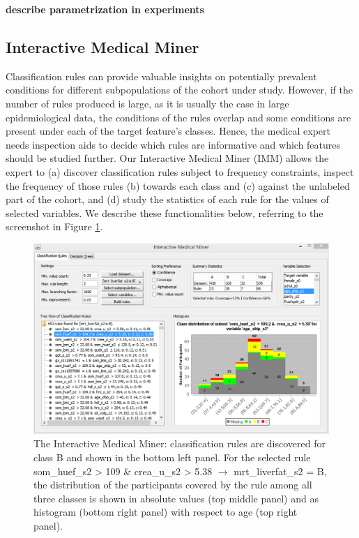 \documentclass[
  oneside]{book}
\begin{document}
\textbf{describe parametrization in experiments}

\hypertarget{interactive-medical-miner}{%
\subsection{Interactive Medical Miner}\label{interactive-medical-miner}}

Classification rules can provide valuable insights on potentially prevalent conditions for different subpopulations of the cohort under study.
However, if the number of rules produced is large, as it is usually the case in large epidemiological data, the conditions of the rules overlap and some conditions are present under each of the target feature's classes.
Hence, the medical expert needs inspection aids to decide which rules are informative and which features should be studied further.
Our Interactive Medical Miner (IMM) allows the expert to (a) discover classification rules subject to frequency constraints, inspect the frequency of those rules (b) towards each class and (c) against the unlabeled part of the cohort, and (d) study the statistics of each rule for the values of selected variables.
We describe these functionalities below, referring to the screenshot in Figure \ref{fig:03-imm-modified}.



\begin{figure}

{\centering \includegraphics[width=0.9\linewidth]{figures/03-imm-modified} 

}

\caption{The Interactive Medical Miner: classification rules are discovered for class B and shown in the bottom left panel. For the selected rule som\_huef\_s2 \textgreater{} 109 \& crea\_u\_s2 \textgreater{} 5.38 \(\longrightarrow\) mrt\_liverfat\_s2 = B, the distribution of the participants covered by the rule among all three classes is shown in absolute values (top middle panel) and as histogram (bottom right panel) with respect to age (top right panel).}\label{fig:03-imm-modified}
\end{figure}
\end{document}
